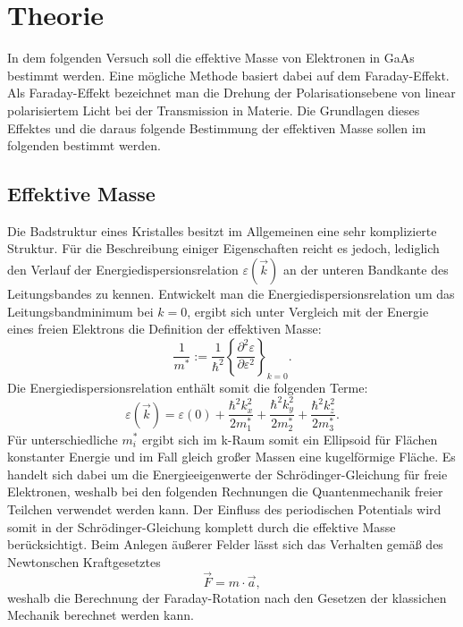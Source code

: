 \section{Theorie}
\label{sec:Theorie}

In dem folgenden Versuch soll die effektive Masse von Elektronen in GaAs bestimmt
werden. Eine mögliche Methode basiert dabei auf dem Faraday-Effekt. Als Faraday-Effekt
bezeichnet man die Drehung der Polarisationsebene von linear polarisiertem
Licht bei der Transmission in Materie. Die Grundlagen dieses Effektes und die
daraus folgende Bestimmung der effektiven Masse sollen im folgenden bestimmt werden.

\subsection{Effektive Masse}
\label{subsec:Masse}

Die Badstruktur eines Kristalles besitzt im Allgemeinen eine sehr komplizierte
Struktur. Für die Beschreibung einiger Eigenschaften reicht es jedoch, lediglich
den Verlauf der Energiedispersionsrelation $\varepsilon(\vec{k})$ an der unteren
Bandkante des Leitungsbandes zu kennen. Entwickelt man die Energiedispersionsrelation
um das Leitungsbandminimum bei $k=0$, ergibt sich unter Vergleich mit der
Energie eines freien Elektrons die Definition der effektiven Masse:
\begin{equation}
  \frac{1}{m^*} := \frac{1}{\hbar^2}\left\{\frac{\partial^2\varepsilon}{\partial\varepsilon^2}\right\}_{k=0}.
  \label{eqn:effMass}
\end{equation}
Die Energiedispersionsrelation enthält somit die folgenden Terme:
\begin{equation}
  \varepsilon(\vec{k}) = \varepsilon(0) + \frac{\hbar^2k_x^2}{2m^*_1}  + \frac{\hbar^2k_y^2}{2m^*_2} + \frac{\hbar^2k_z^2}{2m^*_3}.
  \label{eqn:Energie}
\end{equation}
Für unterschiedliche $m^*_i$ ergibt sich im k-Raum somit ein Ellipsoid für Flächen
konstanter Energie und im Fall gleich großer Massen eine kugelförmige Fläche.
Es handelt sich dabei um die Energieeigenwerte der Schrödinger-Gleichung für
freie Elektronen, weshalb bei den folgenden Rechnungen die Quantenmechanik
freier Teilchen verwendet werden kann. Der Einfluss des periodischen Potentials
wird somit in der Schrödinger-Gleichung komplett durch die effektive Masse
berücksichtigt. Beim Anlegen äußerer Felder lässt sich das Verhalten gemäß
des Newtonschen Kraftgesetztes
\begin{equation}
  \vec{F} = m\cdot\vec{a},
  \label{eqn:Newton2}
\end{equation}
weshalb die Berechnung der Faraday-Rotation nach den Gesetzen der klassichen
Mechanik berechnet werden kann.


